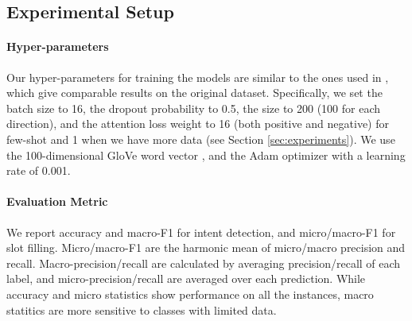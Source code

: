

\subsection{Experimental Setup}
\paragraph{Hyper-parameters}
Our hyper-parameters for training the \NN models are similar to the ones used in \cite{liu2016attention}, which give comparable results on
the original dataset. Specifically, we set the batch size to 16, the dropout probability to 0.5, the \BLSTM size to 200 (100 for each
direction), and the attention loss weight to 16 (both positive and negative) for few-shot and 1 when we have more data (see Section
\ref{sec:experiments}). We use the 100-dimensional GloVe word vector \cite{pennington2014glove}, and the Adam optimizer
\cite{kingma2014adam} with a learning rate of 0.001.

\paragraph{Evaluation Metric}
We report accuracy and macro-F1 for intent detection, and micro/macro-F1 for slot filling.
Micro/macro-F1 are the harmonic mean of micro/macro precision and recall.
Macro-precision/recall are calculated by averaging precision/recall of each label, and micro-precision/recall are averaged over each prediction.
While accuracy and micro statistics show performance on all the instances, macro statitics are more sensitive to classes with limited data.


